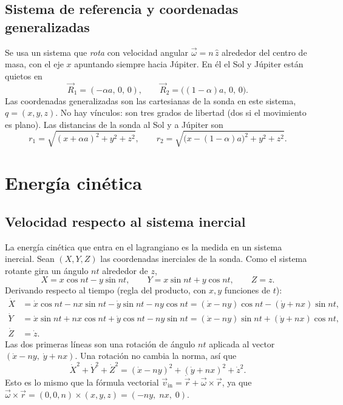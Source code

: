 \documentclass[12pt,letterpaper]{article}
\begin{document}
\subsection{Sistema de referencia y coordenadas generalizadas}

Se usa un sistema que \emph{rota} con velocidad angular $\vec\omega = n\,\hat z$ alrededor del
centro de masa, con el eje $x$ apuntando siempre hacia Júpiter. En él el Sol y Júpiter están
quietos en
\[
\vec R_1 = (-\alpha a,\,0,\,0), \qquad \vec R_2 = \bigl((1-\alpha) a,\,0,\,0\bigr).
\]
Las coordenadas generalizadas son las cartesianas de la sonda en este sistema, $q = (x,y,z)$.
No hay vínculos: son tres grados de libertad (dos si el movimiento es plano). Las distancias
de la sonda al Sol y a Júpiter son
\[
r_1 = \sqrt{(x+\alpha a)^2 + y^2 + z^2}, \qquad
r_2 = \sqrt{\bigl(x-(1-\alpha)a\bigr)^2 + y^2 + z^2}.
\]

\section{Energía cinética}

\subsection{Velocidad respecto al sistema inercial}

La energía cinética que entra en el lagrangiano es la medida en un sistema inercial. Sean
$(X,Y,Z)$ las coordenadas inerciales de la sonda. Como el sistema rotante gira un ángulo $nt$
alrededor de $z$,
\[
X = x\cos nt - y\sin nt, \qquad
Y = x\sin nt + y\cos nt, \qquad
Z = z .
\]
Derivando respecto al tiempo (regla del producto, con $x,y$ funciones de $t$):
\begin{align*}
\dot X &= \dot x\cos nt - n x\sin nt - \dot y\sin nt - n y\cos nt
        = (\dot x - n y)\cos nt - (\dot y + n x)\sin nt,\\
\dot Y &= \dot x\sin nt + n x\cos nt + \dot y\cos nt - n y\sin nt
        = (\dot x - n y)\sin nt + (\dot y + n x)\cos nt,\\
\dot Z &= \dot z .
\end{align*}
Las dos primeras líneas son una rotación de ángulo $nt$ aplicada al vector
$(\dot x - ny,\; \dot y + nx)$. Una rotación no cambia la norma, así que
\[
\dot X^2 + \dot Y^2 + \dot Z^2 = (\dot x - n y)^2 + (\dot y + n x)^2 + \dot z^2 .
\]
Esto es lo mismo que la fórmula vectorial $\vec v_{\mathrm{in}} = \dot{\vec r} + \vec\omega\times\vec r$,
ya que $\vec\omega\times\vec r = (0,0,n)\times(x,y,z) = (-ny,\; nx,\; 0)$.
\end{document}
